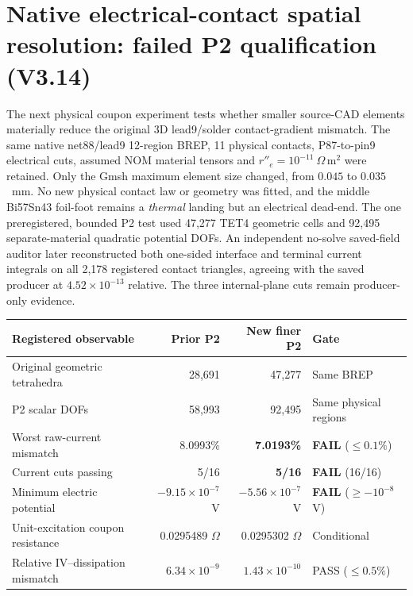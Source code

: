 \clearpage
\section{Native electrical-contact spatial resolution: failed P2 qualification (V3.14)}
\label{sec:v314-original-coupon}
The next physical coupon experiment tests whether smaller source-CAD elements materially reduce the original 3D lead9/solder contact-gradient mismatch. The same native net88/lead9 12-region BREP, 11 physical contacts, P87-to-pin9 electrical cuts, assumed NOM material tensors and \(r''_e=10^{-11}\ \Omega\,\mathrm m^2\) were retained. Only the Gmsh maximum element size changed, from \(0.045\) to \(0.035\)~mm. No new physical contact law or geometry was fitted, and the middle Bi57Sn43 foil-foot remains a \emph{thermal} landing but an electrical dead-end. The one preregistered, bounded P2 test used 47,277 TET4 geometric cells and 92,495 separate-material quadratic potential DOFs. An independent no-solve saved-field auditor later reconstructed both one-sided interface and terminal current integrals on all 2,178 registered contact triangles, agreeing with the saved producer at \(4.52\times10^{-13}\) relative. The three internal-plane cuts remain producer-only evidence.

\begin{center}\small
\begin{tabular}{lrrl}\toprule
Registered observable & Prior P2 & New finer P2 & Gate\\\midrule
Original geometric tetrahedra & 28,691 & 47,277 & Same BREP\\
P2 scalar DOFs & 58,993 & 92,495 & Same physical regions\\
Worst raw-current mismatch & 8.0993\% & \textbf{7.0193\%} & \textbf{FAIL} (\(\leq 0.1\%\))\\
Current cuts passing & 5/16 & \textbf{5/16} & \textbf{FAIL} (16/16)\\
Minimum electric potential & \(-9.15\times10^{-7}\) V & \(-5.56\times10^{-7}\) V & \textbf{FAIL} (\(\geq-10^{-8}\) V)\\
Unit-excitation coupon resistance & 0.0295489 \(\Omega\) & 0.0295302 \(\Omega\) & Conditional\\
Relative IV--dissipation mismatch & \(6.34\times10^{-9}\) & \(1.43\times10^{-10}\) & PASS (\(\leq0.5\%\))\\\bottomrule
\end{tabular}
\end{center}


